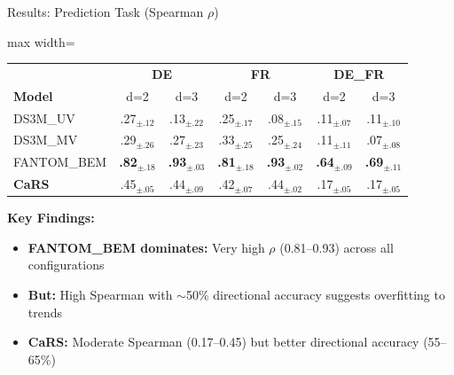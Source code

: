 \documentclass[aspectratio=169]{beamer}
\begin{document}
\begin{frame}{Results: Prediction Task (Spearman $\rho$)}
\begin{table}
\centering
\small
\begin{adjustbox}{max width=\textwidth}
\begin{tabular}{l|cc|cc|cc}
\toprule
& \multicolumn{2}{c|}{\textbf{DE}} & \multicolumn{2}{c|}{\textbf{FR}} & \multicolumn{2}{c}{\textbf{DE\_FR}} \\
\textbf{Model} & d=2 & d=3 & d=2 & d=3 & d=2 & d=3 \\
\midrule
DS3M\_UV & .27$_{\pm.12}$ & .13$_{\pm.22}$ & .25$_{\pm.17}$ & .08$_{\pm.15}$ & .11$_{\pm.07}$ & .11$_{\pm.10}$ \\
DS3M\_MV & .29$_{\pm.26}$ & .27$_{\pm.23}$ & .33$_{\pm.25}$ & .25$_{\pm.24}$ & .11$_{\pm.11}$ & .07$_{\pm.08}$ \\
FANTOM\_BEM & \textbf{.82}$_{\pm.18}$ & \textbf{.93}$_{\pm.03}$ & \textbf{.81}$_{\pm.18}$ & \textbf{.93}$_{\pm.02}$ & \textbf{.64}$_{\pm.09}$ & \textbf{.69}$_{\pm.11}$ \\
\midrule
\textbf{CaRS} & .45$_{\pm.05}$ & .44$_{\pm.09}$ & .42$_{\pm.07}$ & .44$_{\pm.02}$ & .17$_{\pm.05}$ & .17$_{\pm.05}$ \\
\bottomrule
\end{tabular}
\end{adjustbox}
\end{table}


\vspace{0.2cm}
\textbf{Key Findings:}
\begin{itemize}
    \item \textbf{FANTOM\_BEM dominates:} Very high $\rho$ (0.81--0.93) across all configurations
    \item \textbf{But:} High Spearman with $\sim$50\% directional accuracy suggests overfitting to trends
    \item \textbf{CaRS:} Moderate Spearman (0.17--0.45) but better directional accuracy (55--65\%)
\end{itemize}
\end{frame}
\end{document}
